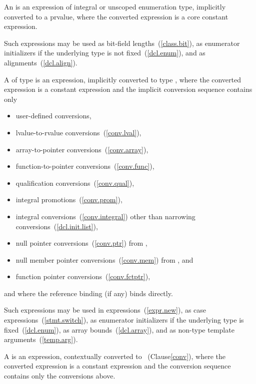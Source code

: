 \pnum
An 
is an expression of integral or
unscoped enumeration type, implicitly converted to a prvalue, where the converted expression is a core constant expression.
\begin{note}
Such expressions may be
used as bit-field lengths~(\ref{class.bit}), as enumerator
initializers if the underlying type is not fixed~(\ref{dcl.enum}),
and as alignments~(\ref{dcl.align}).
\end{note}

\pnum
A 
of type  is an
expression, implicitly converted to type , where
the converted expression is a constant expression and the
implicit conversion sequence contains only

\begin{itemize}
\item user-defined conversions,
\item lvalue-to-rvalue conversions~(\ref{conv.lval}),
\item array-to-pointer conversions~(\ref{conv.array}),
\item function-to-pointer conversions~(\ref{conv.func}),
\item qualification conversions~(\ref{conv.qual}),
\item integral promotions~(\ref{conv.prom}),
\item integral conversions~(\ref{conv.integral}) other than narrowing conversions~(\ref{dcl.init.list}),
\item null pointer conversions~(\ref{conv.ptr}) from ,
\item null member pointer conversions~(\ref{conv.mem}) from , and
\item function pointer conversions~(\ref{conv.fctptr}),
\end{itemize}

and where the reference binding (if any) binds directly.
\begin{note}
Such expressions may be used in 
expressions~(\ref{expr.new}), as case expressions~(\ref{stmt.switch}),
as enumerator initializers if the underlying type is
fixed~(\ref{dcl.enum}), as array bounds~(\ref{dcl.array}), and
as non-type template
arguments~(\ref{temp.arg}). 
\end{note}
%
%
A  is
an expression, contextually converted to ~(Clause\ref{conv}),
where the converted expression is a constant expression and
the conversion sequence contains only the conversions above.

